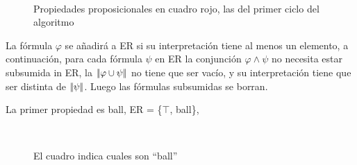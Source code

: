 \begin{figure}[ht]
\begin{center}
\\[0pt]
\caption{Propiedades proposicionales en cuadro rojo, las del primer ciclo del algoritmo}
\label{fig-modelo2}
\end{center}
\end{figure}

La f\'ormula $\varphi$ se a\~nadir\'a a ER si su interpretaci\'on tiene al menos un elemento, a continuaci\'on, para cada f\'ormula
 $\psi$ en ER la conjunci\'on
$\varphi  \wedge \psi$ no necesita estar subsumida in ER, la $|\!|\varphi \cup \psi|\!|$ no tiene que ser vac\'io, y su interpretaci\'on tiene que ser distinta de $|\!|\psi|\!|$. Luego las f\'ormulas subsumidas se borran.

La primer propiedad es \textsf{ball}, ER = \{$\top$, \textsf{ball}\}, 

\begin{figure}[ht]
\begin{center}
\\[0pt]
\caption{El cuadro indica cuales son ``ball''}
\label{fig-modelo3}
\end{center}
\end{figure}

